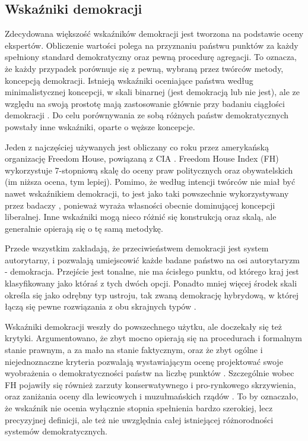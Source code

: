 \documentclass[12pt]{article}
\begin{document}
\hypertarget{wskaux17aniki-demokracji}{%
\subsection{Wskaźniki demokracji}\label{wskaux17aniki-demokracji}}

Zdecydowana większość wskaźników demokracji jest tworzona na podstawie oceny ekspertów. Obliczenie wartości polega na przyznaniu państwu punktów za każdy spełniony standard demokratyczny oraz pewną procedurę agregacji. To oznacza, że każdy przypadek porównuje się z pewną, wybraną przez twórców metody, koncepcją demokracji. Istnieją wskaźniki oceniające państwa według minimalistycznej koncepcji, w skali binarnej (jest demokracją lub nie jest), ale ze względu na swoją prostotę mają zastosowanie głównie przy badaniu ciągłości demokracji \citep{Coppedge}. Do celu porównywania ze sobą różnych państw demokratycznych powstały inne wskaźniki, oparte o węższe koncepcje.

Jeden z najczęściej używanych jest obliczany co roku przez amerykańską organizację Freedom House, powiązaną z CIA \citep{Doorenspleet}. Freedom House Index (FH) wykorzystuje 7-stopniową skalę do oceny praw politycznych oraz obywatelskich (im niższa ocena, tym lepiej). Pomimo, że według intencji twórców nie miał być nawet wskaźnikiem demokracji, to jest jako taki powszechnie wykorzystywany przez badaczy \citep{Coppedge}, ponieważ wyraża własności obecnie dominującej koncepcji liberalnej. Inne wskaźniki mogą nieco różnić się konstrukcją oraz skalą, ale generalnie opierają się o tę samą metodykę.

Przede wszystkim zakładają, że przeciwieństwem demokracji jest system autorytarny, i pozwalają umiejscowić każde badane państwo na osi autorytaryzm - demokracja. Przejście jest tonalne, nie ma ścisłego punktu, od którego kraj jest klasyfikowany jako któraś z tych dwóch opcji. Ponadto mniej więcej środek skali określa się jako odrębny typ ustroju, tak zwaną demokrację hybrydową, w której łączą się pewne rozwiązania z obu skrajnych typów \citep{Doorenspleet}.

Wskaźniki demokracji weszły do powszechnego użytku, ale doczekały się też krytyki. Argumentowano, że zbyt mocno opierają się na procedurach i formalnym stanie prawnym, a za mało na stanie faktycznym, oraz że zbyt ogólne i niejednoznaczne kryteria pozwalają wystawiającym ocenę projektować swoje wyobrażenia o demokratyczności państw na liczbę punktów \citep{Coppedge}. Szczególnie wobec FH pojawiły się również zarzuty konserwatywnego i pro-rynkowego skrzywienia, oraz zaniżania oceny dla lewicowych i muzułmańskich rządów \citep{Doorenspleet}. To by oznaczało, że wskaźnik nie ocenia wyłącznie stopnia spełnienia bardzo szerokiej, lecz precyzyjnej definicji, ale też nie uwzględnia całej istniejącej różnorodności systemów demokratycznych.
\end{document}
